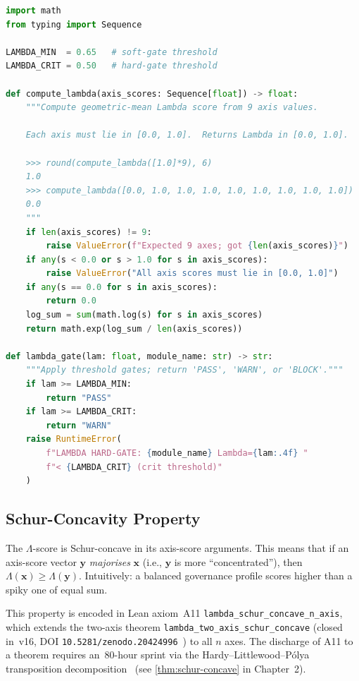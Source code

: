 \begin{lstlisting}[language=Python, caption={\(\Lambda\)-axis gate
  implementation}, label={lst:lambda-gate}]
import math
from typing import Sequence

LAMBDA_MIN  = 0.65   # soft-gate threshold
LAMBDA_CRIT = 0.50   # hard-gate threshold

def compute_lambda(axis_scores: Sequence[float]) -> float:
    """Compute geometric-mean Lambda score from 9 axis values.
    
    Each axis must lie in [0.0, 1.0].  Returns Lambda in [0.0, 1.0].
    
    >>> round(compute_lambda([1.0]*9), 6)
    1.0
    >>> compute_lambda([0.0, 1.0, 1.0, 1.0, 1.0, 1.0, 1.0, 1.0, 1.0])
    0.0
    """
    if len(axis_scores) != 9:
        raise ValueError(f"Expected 9 axes; got {len(axis_scores)}")
    if any(s < 0.0 or s > 1.0 for s in axis_scores):
        raise ValueError("All axis scores must lie in [0.0, 1.0]")
    if any(s == 0.0 for s in axis_scores):
        return 0.0
    log_sum = sum(math.log(s) for s in axis_scores)
    return math.exp(log_sum / len(axis_scores))

def lambda_gate(lam: float, module_name: str) -> str:
    """Apply threshold gates; return 'PASS', 'WARN', or 'BLOCK'."""
    if lam >= LAMBDA_MIN:
        return "PASS"
    if lam >= LAMBDA_CRIT:
        return "WARN"
    raise RuntimeError(
        f"LAMBDA HARD-GATE: {module_name} Lambda={lam:.4f} "
        f"< {LAMBDA_CRIT} (crit threshold)"
    )
\end{lstlisting}

\subsection{Schur-Concavity Property}
\label{ssec:schur}

The \(\Lambda\)-score is Schur-concave in its axis-score arguments.  This
means that if an axis-score vector \(\mathbf{y}\) \emph{majorises}
\(\mathbf{x}\) (i.e., \(\mathbf{y}\) is more ``concentrated''), then
\(\Lambda(\mathbf{x}) \geq \Lambda(\mathbf{y})\).  Intuitively: a balanced
governance profile scores higher than a spiky one of equal sum.

This property is encoded in Lean axiom~A11
\texttt{lambda\_schur\_concave\_n\_axis}, which extends the two-axis theorem
\texttt{lambda\_two\_axis\_schur\_concave} (closed in~v16, DOI
\texttt{10.5281/zenodo.20424996}~\cite{lutar_v16_doi}) to all \(n\) axes.
The discharge of A11 to a theorem requires an~80-hour sprint via the
Hardy--Littlewood--P\'olya transposition decomposition~\cite{hlp_1934}
(see \cref{thm:schur-concave} in Chapter~2).

